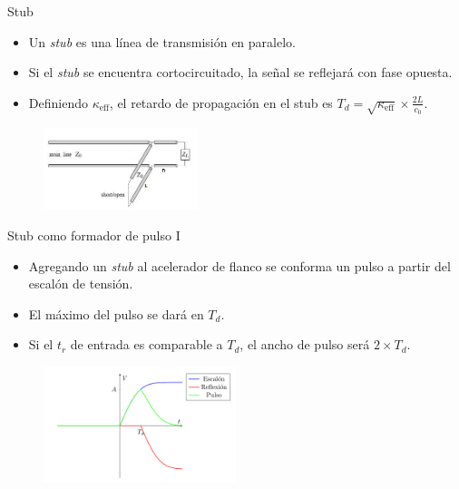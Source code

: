 \documentclass{beamer}
\begin{document}
\begin{frame}{Stub}

    \begin{itemize}
        \item Un \textit{stub} es una línea de transmisión en paralelo.
        \item Si el \textit{stub} se encuentra cortocircuitado, la señal se
            reflejará con fase opuesta.
        \item Definiendo $\kappa_{\text{eff}}$, el retardo de propagación en el
            stub es $T_d = \sqrt{\kappa_{\text{eff}}} \times \frac{2L}{c_0}$.
    \end{itemize}

    \begin{figure}
        \centering
        \includegraphics[width=0.4\textwidth]{images/StubMatch.jpeg}
    \end{figure}

\end{frame}

\begin{frame}{Stub como formador de pulso I}

    \begin{itemize}
        \item Agregando un \textit{stub} al acelerador de flanco se conforma un
            pulso a partir del escalón de tensión.
        \item El máximo del pulso se dará en $T_d$.
        \item Si el $t_r$ de entrada es comparable a $T_d$, el ancho de pulso
            será $2 \times T_d$.
    \end{itemize}

    \begin{figure}[h!]
        \centering
        \includegraphics[width=0.5\textwidth]{images/pulse_generation_capture.png}
    \end{figure}

\end{frame}
\end{document}
